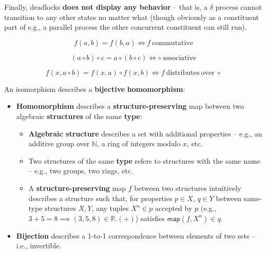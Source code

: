 \documentclass[99-notes-packed.tex]{subfiles}
\begin{document}
Finally, deadlocks \textbf{does not display any behavior} -- that is, a $\delta$ process cannot transition to any other states no matter what (though obviously as a constituent part of e.g., a parallel process the other concurrent constituent can still run). 

\begin{background}[commutativity]
    \begin{equation*}
        f(a, b) = f(b, a) \iff f\ \mathrm{commutative}
    \end{equation*}
\end{background}

\begin{background}[associativity]
    \begin{equation*}
        (a \circ b) \circ c = a \circ (b \circ c) \iff \circ\ \mathrm{associative}
    \end{equation*}
\end{background}

\begin{background}[distributivity]
    \begin{equation*}
        f(x, a \circ b) = f(x, a) \circ f(x, b) \iff f\ \mathrm{distributes\ over}\ \circ
    \end{equation*}
\end{background}

\begin{background}[isomorphism]
    An isomorphism describes a \textbf{bijective} \textbf{homomorphism}: 
    \begin{itemize}
        \item {
            \textbf{Homomorphism} describes a \textbf{structure-preserving} map between two algebraic \textbf{structures} of the same \textbf{type}: 
            \begin{itemize}
                \item {
                    \textbf{Algebraic structure} describes a set with additional properties -- e.g., an additive group over $\mathbb{N}$, a ring of integers modulo $x$, etc. 
                }
                \item {
                    Two structures of the same \textbf{type} refers to structures with the same name -- e.g., two groups, two rings, etc. 
                }
                \item {
                    A \textbf{structure-preserving} map $f$ between two structures intuitively describes a structure such that, for properties $p \in X$, $q \in Y$ between same-type structures $X, Y$, any tuples $X^n \in p$ accepted by $p$ (e.g., $3 + 5 = 8 \implies (3, 5, 8) \in \mathbb{R}.(+)$) satisfies $\mathsf{map}(f, X^n) \in q$. 
                }
            \end{itemize}
        }
        \item {
            \textbf{Bijection} describes a 1-to-1 correspondence between elements of two sets -- i.e., invertible. 
        }
    \end{itemize}
\end{background}
\end{document}

